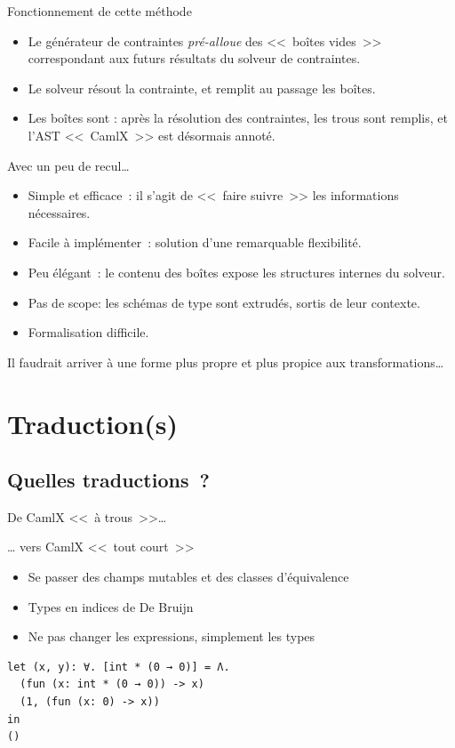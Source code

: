 \documentclass[final]{beamer}
\begin{document}
\begin{frame}{Fonctionnement de cette méthode}
  \begin{itemize}
    \item Le générateur de contraintes \emph{pré-alloue} des <<~boîtes vides~>>
      correspondant aux futurs résultats du solveur de contraintes.
    \item Le solveur résout la contrainte, et remplit au passage les boîtes.
    \item Les boîtes sont \underline{}: après la résolution des
      contraintes, les trous sont remplis, et l'AST <<~CamlX~>> est désormais annoté.
  \end{itemize}
\end{frame}

\begin{frame}{Avec un peu de recul…}
  \begin{itemize}
    \item Simple et efficace~: il s'agit de <<~faire suivre~>> les informations
      nécessaires.
    \item Facile à implémenter~: solution d'une remarquable flexibilité.
    \item Peu élégant~: le contenu des boîtes expose les structures internes du
      solveur.
    \item Pas de scope: les schémas de type sont extrudés, sortis de leur
      contexte.
    \item Formalisation difficile.
  \end{itemize}
  Il faudrait arriver à une forme plus propre et plus propice aux
  transformations…
\end{frame}

\section{Traduction(s)}

\subsection{Quelles traductions~?}

\begin{frame}[fragile]{De CamlX <<~à trous~>>…}

  … vers CamlX <<~tout court~>>

  \begin{itemize}
    \item Se passer des champs mutables et des classes d'équivalence
    \item Types en indices de De Bruijn
    \item Ne pas changer les expressions, simplement les types
  \end{itemize}

  \begin{verbatim}
let (x, y): ∀. [int * (0 → 0)] = Λ. 
  (fun (x: int * (0 → 0)) -> x)
  (1, (fun (x: 0) -> x))
in
()
  \end{verbatim}
\end{frame}
\end{document}
